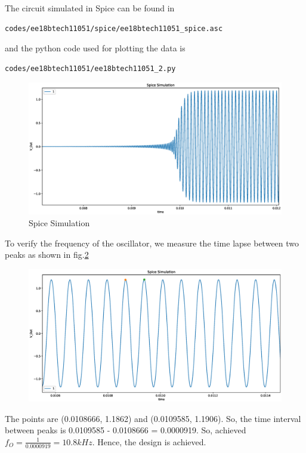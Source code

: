 \begin{enumerate}[label=\arabic*.,ref=\theenumi]
The circuit simulated in Spice can be found in
\begin{lstlisting}
codes/ee18btech11051/spice/ee18btech11051_spice.asc
\end{lstlisting}
and the python code used for plotting the data is
\begin{lstlisting}
codes/ee18btech11051/ee18btech11051_2.py
\end{lstlisting}

\begin{figure}[!ht]
\centering
\includegraphics[width=\columnwidth]{./figs/ee18btech11051/ee18btech11051_plot2.eps}
\caption{Spice Simulation}
\label{fig:ee18btech11051_plot2}
\end{figure}

To verify the frequency of the oscillator, we measure the time lapse between two peaks as shown in fig.\ref{fig:ee18btech11051_plot3}

\begin{figure}[!ht]
\centering
\includegraphics[width=\columnwidth]{./figs/ee18btech11051/ee18btech11051_plot3.eps}
\caption{}
\label{fig:ee18btech11051_plot3}
\end{figure}

The points are (0.0108666, 1.1862) and (0.0109585, 1.1906). So, the time interval between peaks is 0.0109585 - 0.0108666 = 0.0000919.
So, achieved $f_{O} = \frac{1}{0.0000919} = 10.8kHz$. Hence, the design is achieved.

\end{enumerate}
